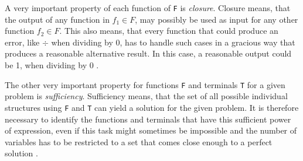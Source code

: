 \documentclass[runningheads]{llncs}
\begin{document}
A very important property of each function of \texttt{F} is \emph{closure}. Closure means, that the output of any function in $f_1 \in F$, may possibly be used as input for any other function $f_2 \in F$. This also means, that every function that could produce an error, like $\div$ when dividing by 0, has to handle such cases in a gracious way that produces a reasonable alternative result. In this case, a reasonable output could be 1, when dividing by 0 \cite[81-82]{gp1-1993}.

The other very important property for functions \texttt{F} and terminals \texttt{T} for a given problem is \emph{sufficiency}. Sufficiency means, that the set of all possible individual structures using \texttt{F} and \texttt{T} can yield a solution for the given problem. It is therefore necessary to identify the functions and terminals that have this sufficient power of expression, even if this task might sometimes be impossible and the number of variables has to be restricted to a set that comes close enough to a perfect solution \cite[86-87]{gp1-1993}.
\end{document}
